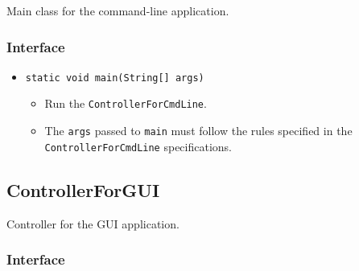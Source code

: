 \documentclass[12pt]{article}
\newcommand{\bi}{\begin{itemize}}
\newcommand{\ei}{\end{itemize}}
\newcommand{\code}[1]{\texttt{#1}}
\begin{document}
Main class for the command-line application.

\subsubsection{Interface}

\bi
   	\item \code{static void main(String[] args)}
	\bi
		\item Run the \code{ControllerForCmdLine}.
		\item The \code{args} passed to \code{main} must follow the rules specified in the \code{ControllerForCmdLine} specifications. 
	\ei

\ei

\newpage

\subsection{ControllerForGUI}

Controller for the GUI application.

\subsubsection{Interface}
\end{document}
